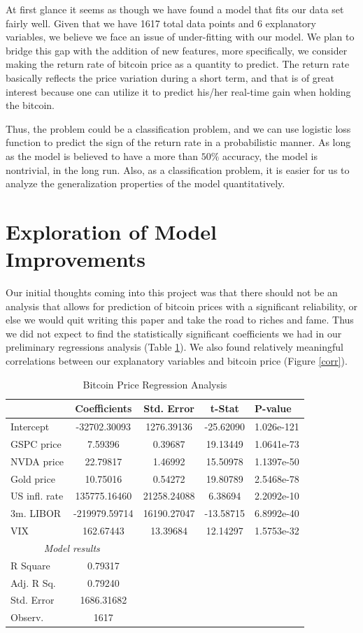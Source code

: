 \documentclass[9pt,twocolumn,twoside]{ilcss}
\begin{document}
At first glance it seems as though we have found a model that fits our data set fairly well. Given that we have 1617 total data points and 6 explanatory variables, we believe we face an issue of under-fitting with our model. We plan to bridge this gap with the addition of new features, more specifically, we consider making the return rate of bitcoin price as a quantity to predict. The return rate basically reflects the price variation during a short term, and that is of great interest because one can utilize it to predict his/her real-time gain when holding the bitcoin. 

Thus, the problem could be a classification problem, and we can use logistic loss function to predict the sign of the return rate in a probabilistic manner. As long as the model is believed to have a more than $50\%$ accuracy, the model is nontrivial, in the long run. Also, as a classification problem, it is easier for us to analyze the generalization properties of the model quantitatively.

\section{Exploration of Model Improvements}
Our initial thoughts coming into this project was that there should not be an analysis that allows for prediction of bitcoin prices with a significant reliability, or else we would quit writing this paper and take the road to riches and fame. Thus we did not expect to find the statistically significant coefficients we had in our preliminary regressions analysis (Table \ref{BTC_Price_reg_analysis}). We also found relatively meaningful correlations between our explanatory variables and bitcoin price (Figure \ref{corr}).

\begin{table}[h]
\centering
\caption{Bitcoin Price Regression Analysis}
\label{BTC_Price_reg_analysis}
\begin{tabular}{@{\extracolsep{0pt}}lcccl} 
\hline
\hline
& Coefficients  & Std. Error  & t-Stat  & P-value\\ 
\hline
Intercept  & -32702.30093 & 1276.39136 & -25.62090 & 1.026e-121\\
GSPC price & 7.59396 & 0.39687 & 19.13449 & 1.0641e-73\\
NVDA price & 22.79817 & 1.46992 & 15.50978 & 1.1397e-50\\
Gold price & 10.75016 & 0.54272 & 19.80789 & 2.5468e-78\\
US infl. rate & 135775.16460 & 21258.24088 & 6.38694 & 2.2092e-10\\
3m. LIBOR & -219979.59714 & 16190.27047 & -13.58715 & 6.8992e-40\\
VIX & 162.67443 & 13.39684 & 12.14297 & 1.5753e-32\\
\hline
\multicolumn{2}{c}{\textit{Model results}}\\
\cline{1-2}
R Square & 0.79317 \\
Adj. R Sq. & 0.79240 \\
Std. Error & 1686.31682 \\
Observ. & 1617 \\
\hline
\end{tabular}
\end{table}
\end{document}
